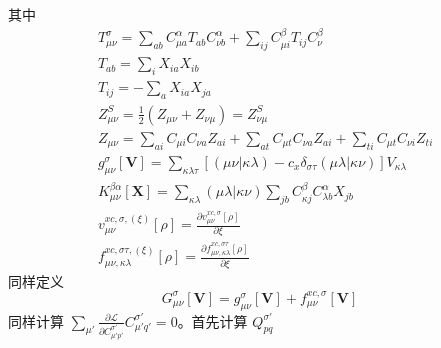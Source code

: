 \documentclass[11pt]{ctexart}
\numberwithin{equation}{section}
\begin{document}
其中
\begin{equation}
    \begin{aligned}
        & T_{\mu\nu}^{\sigma} 
        = \sum_{ab}C_{\mu a}^{\alpha}T_{ab}C_{\nu b}^{\alpha}
        + \sum_{ij}C_{\mu i}^{\beta}T_{ij}C_{\nu}^{\beta}\\
        & T_{ab} = \sum_{i}X_{ia}X_{ib}\\
        & T_{ij} = -\sum_{a}X_{ia}X_{ja}\\
        & Z_{\mu\nu}^{S} 
        = \frac{1}{2}(Z_{\mu\nu} + Z_{\nu\mu})
        = Z_{\nu\mu}^{S}\\
        & Z_{\mu\nu} 
        = \sum_{ai}C_{\mu i}C_{\nu a}Z_{ai}
        + \sum_{at}C_{\mu t}C_{\nu a}Z_{ai}
        + \sum_{ti}C_{\mu t}C_{\nu i}Z_{ti}\\
        & g_{\mu\nu}^{\sigma}[\mathbf{V}] = \sum_{\kappa\lambda\tau}[(\mu\nu|\kappa\lambda)-c_x\delta_{\sigma\tau}(\mu\lambda|\kappa\nu)]V_{\kappa\lambda}\\
        & K_{\mu\nu}^{\beta\alpha}[\mathbf{X}] = \sum_{\kappa\lambda}(\mu\lambda|\kappa\nu)\sum_{jb}C_{\kappa j}^{\beta}C_{\lambda b}^{\alpha}X_{jb}\\
        & v_{\mu\nu}^{xc,\sigma,(\xi)}[\rho] = \frac{\partial v_{\mu\nu}^{xc,\sigma}[\rho]}{\partial \xi}\\
        & f_{\mu\nu,\kappa\lambda}^{xc,\sigma\tau,(\xi)}[\rho] = \frac{\partial f_{\mu\nu,\kappa\lambda}^{xc,\sigma\tau}[\rho]}{\partial\xi}
    \end{aligned}
\end{equation}
同样定义
\begin{equation}
    G_{\mu\nu}^{\sigma}[\mathbf{V}] = g_{\mu\nu}^{\sigma}[\mathbf{V}] + f_{\mu\nu}^{xc,\sigma}[\mathbf{V}]
\end{equation}
同样计算 $\sum_{\mu'}\frac{\partial\mathcal{L}}{\partial C_{\mu' p'}^{\sigma'}}C_{\mu'q'}^{\sigma'}=0$。首先计算 $Q_{pq}^{\sigma'}$
\end{document}
